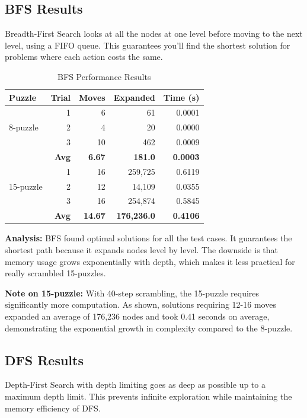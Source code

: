 \documentclass[letterpaper]{article}
\begin{document}
\subsection{BFS Results}

Breadth-First Search looks at all the nodes at one level before moving to the next level, using a FIFO queue. This guarantees you'll find the shortest solution for problems where each action costs the same.

\begin{table}[h]
\centering
\tiny
\begin{tabular}{lrrrr}
\toprule
\textbf{Puzzle} & \textbf{Trial} & \textbf{Moves} & \textbf{Expanded} & \textbf{Time (s)} \\
\midrule
\multirow{3}{*}{8-puzzle} & 1 & 6 & 61 & 0.0001 \\
& 2 & 4 & 20 & 0.0000 \\
& 3 & 10 & 462 & 0.0009 \\
\cmidrule{2-5}
& \textbf{Avg} & \textbf{6.67} & \textbf{181.0} & \textbf{0.0003} \\
\midrule
\multirow{3}{*}{15-puzzle} & 1 & 16 & 259,725 & 0.6119 \\
& 2 & 12 & 14,109 & 0.0355 \\
& 3 & 16 & 254,874 & 0.5845 \\
\cmidrule{2-5}
& \textbf{Avg} & \textbf{14.67} & \textbf{176,236.0} & \textbf{0.4106} \\
\bottomrule
\end{tabular}
\caption{BFS Performance Results}
\end{table}

\textbf{Analysis:} BFS found optimal solutions for all the test cases. It guarantees the shortest path because it expands nodes level by level. The downside is that memory usage grows exponentially with depth, which makes it less practical for really scrambled 15-puzzles. 

\textbf{Note on 15-puzzle:} With 40-step scrambling, the 15-puzzle requires significantly more computation. As shown, solutions requiring 12-16 moves expanded an average of 176,236 nodes and took 0.41 seconds on average, demonstrating the exponential growth in complexity compared to the 8-puzzle.

\subsection{DFS Results}

Depth-First Search with depth limiting goes as deep as possible up to a maximum depth limit. This prevents infinite exploration while maintaining the memory efficiency of DFS.
\end{document}

